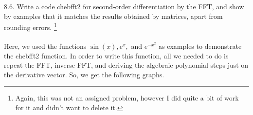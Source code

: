 \documentclass[12pt]{article}
\begin{document}
\newpage

\newpage

8.6. Write a code chebfft2 for second-order differentiation by the FFT, and show by examples that it matches the
results obtained by matrices, apart from rounding errors.
\footnote{Again, this was not an assigned problem, however I did quite a bit of work for it and didn't want to delete it.}\\\\

Here, we used the functions $\sin(x), e^x,$ and $e^{-x^2}$ as examples to demonstrate the chebfft2 function.
In order to write this function, all we needed to do is repeat the FFT, inverse FFT, and deriving the algebraic
polynomial steps just on the derivative vector. So, we get the following graphs.\\
\end{document}
